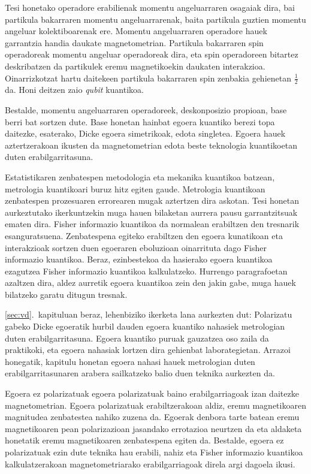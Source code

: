 Tesi honetako operadore erabilienak momentu angeluarraren osagaiak dira, bai partikula bakarraren momentu angeluarrarenak, baita partikula guztien momentu angeluar kolektiboarenak ere.
Momentu angeluarraren operadore hauek garrantzia handia daukate magnetometrian.
Partikula bakarraren spin operadoreak momentu angeluar operadoreak dira, eta spin operadoreen bitartez deskribatzen da partikulek eremu magnetikoekin daukaten interakzioa.
Oinarrizkotzat hartu daitekeen partikula bakarraren spin zenbakia gehienetan $\frac{1}{2}$ da.
Honi deitzen zaio \emph{qubit} kuantikoa.

Bestalde, momentu angeluarraren operadoreek, deskonposizio propioan, base berri bat sortzen dute.
Base honetan hainbat egoera kuantiko berezi topa daitezke, esaterako, Dicke egoera simetrikoak, edota singletea.
Egoera hauek aztertzerakoan ikusten da magnetometrian edota beste teknologia kuantikoetan duten erabilgarritasuna.

Estatistikaren zenbatespen metodologia eta mekanika kuantikoa batzean, metrologia kuantikoari buruz hitz egiten gaude.
Metrologia kuantikoan zenbatespen prozesuaren errorearen mugak aztertzen dira askotan.
Tesi honetan aurkeztutako ikerkuntzekin muga hauen bilaketan aurrera pausu garrantzitsuak ematen dira.
Fisher informazio kuantikoa da normalean erabiltzen den tresnarik esanguratsuena.
Zenbatespena egiteko erabiltzen den egoera kunatikoan eta interakzioak sortzen duen egoeraren eboluzioan oinarrituta dago Fisher informazio kuantikoa.
Beraz, ezinbestekoa da hasierako egoera kuantikoa ezagutzea Fisher informazio kuantikoa kalkulatzeko.
Hurrengo paragrafoetan azaltzen dira, aldez aurretik egoera kuantikoa zein den jakin gabe, muga hauek bilatzeko garatu ditugun tresnak.

\ref{sec:vd}.~kapituluan beraz, lehenbiziko ikerketa lana aurkezten dut: Polarizatu gabeko Dicke egoeratik hurbil dauden egoera kuantiko nahasiek metrologian duten erabilgarritasuna.
Egoera kuantiko puruak gauzatzea oso zaila da praktikoki, eta egoera nahasiak lortzen dira gehienbat laborategietan.
Arrazoi honegatik, kapitulu honetan egoera nahasi hauek metrologian duten erabilgarritasunaren arabera sailkatzeko balio duen teknika aurkezten da.

Egoera ez polarizatuak egoera polarizatuak baino erabilgarriagoak izan daitezke magnetometrian.
Egoera polarizatuak erabiltzerakoan aldiz, eremu magnetikoaren magnitudea zenbatestea nahiko zuzena da.
Egoerak denbora tarte batean eremu magnetikoaren pean polarizazioan jasandako  errotazioa neurtzen da eta aldaketa honetatik eremu magnetikoaren zenbatespena egiten da.
Bestalde, egoera ez polarizatuak ezin dute teknika hau erabili, nahiz eta Fisher informazio kuantikoa kalkulatzerakoan magnetometriarako erabilgarriagoak direla argi dagoela ikusi.

